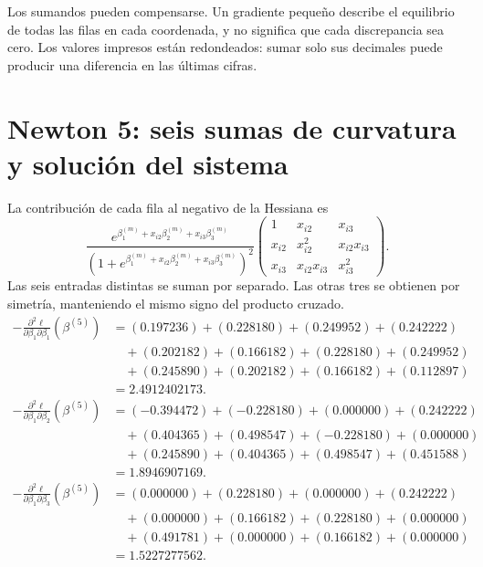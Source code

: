 \documentclass[11pt,a4paper]{article}
\begin{document}
Los sumandos pueden compensarse.
Un gradiente pequeño describe el equilibrio de todas las filas
en cada coordenada, y no significa que cada discrepancia sea cero.
Los valores impresos están redondeados: sumar solo sus decimales
puede producir una diferencia en las últimas cifras.

\clearpage
\section{Newton 5: seis sumas de curvatura y solución del sistema}\label{logit107}
\begingroup\small
\setlength{\abovedisplayskip}{3pt}\setlength{\belowdisplayskip}{3pt}
\setlength{\jot}{2pt}\setlength{\parskip}{3pt}
La contribución de cada fila al negativo de la Hessiana es
\[
\frac{e^{\beta_1^{(m)}+x_{i2}\beta_2^{(m)}+x_{i3}\beta_3^{(m)}}}
{(1+e^{\beta_1^{(m)}+x_{i2}\beta_2^{(m)}+x_{i3}\beta_3^{(m)}})^2}
\begin{pmatrix}
1&x_{i2}&x_{i3}\\
x_{i2}&x_{i2}^2&x_{i2}x_{i3}\\
x_{i3}&x_{i2}x_{i3}&x_{i3}^2
\end{pmatrix}.
\]
Las seis entradas distintas se suman por separado.
Las otras tres se obtienen por simetría, manteniendo el
mismo signo del producto cruzado.
\[
\begin{aligned}
-\frac{\partial^2\ell}{\partial\beta_1\partial\beta_1}(\beta^{(5)})&=(0.197236)+(0.228180)+(0.249952)+(0.242222)\\&\quad+(0.202182)+(0.166182)+(0.228180)+(0.249952)\\&\quad+(0.245890)+(0.202182)+(0.166182)+(0.112897)\\&=2.4912402173.\end{aligned}
\]
\[
\begin{aligned}
-\frac{\partial^2\ell}{\partial\beta_1\partial\beta_2}(\beta^{(5)})&=(-0.394472)+(-0.228180)+(0.000000)+(0.242222)\\&\quad+(0.404365)+(0.498547)+(-0.228180)+(0.000000)\\&\quad+(0.245890)+(0.404365)+(0.498547)+(0.451588)\\&=1.8946907169.\end{aligned}
\]
\[
\begin{aligned}
-\frac{\partial^2\ell}{\partial\beta_1\partial\beta_3}(\beta^{(5)})&=(0.000000)+(0.228180)+(0.000000)+(0.242222)\\&\quad+(0.000000)+(0.166182)+(0.228180)+(0.000000)\\&\quad+(0.491781)+(0.000000)+(0.166182)+(0.000000)\\&=1.5227277562.\end{aligned}
\]
\end{document}
